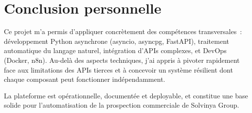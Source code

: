 \section*{Conclusion personnelle}

Ce projet m'a permis d'appliquer concrètement des compétences transversales~:
développement Python asynchrone (asyncio, asyncpg, FastAPI), traitement
automatique du langage naturel, intégration d'APIs complexes, et DevOps
(Docker, n8n). Au-delà des aspects techniques, j'ai appris à pivoter rapidement
face aux limitations des APIs tierces et à concevoir un système résilient dont
chaque composant peut fonctionner indépendamment.

La plateforme est opérationnelle, documentée et deployable, et constitue une
base solide pour l'automatisation de la prospection commerciale de Solvinya Group.
